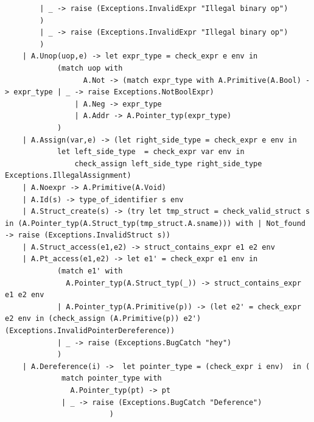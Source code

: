 \documentclass{article}
\begin{document}
\begin{lstlisting}
		| _ -> raise (Exceptions.InvalidExpr "Illegal binary op") 
		)
		| _ -> raise (Exceptions.InvalidExpr "Illegal binary op") 
		) 
	| A.Unop(uop,e) -> let expr_type = check_expr e env in
			(match uop with
				  A.Not -> (match expr_type with A.Primitive(A.Bool) -> expr_type | _ -> raise Exceptions.NotBoolExpr) 
				| A.Neg -> expr_type
				| A.Addr -> A.Pointer_typ(expr_type)
			)
	| A.Assign(var,e) -> (let right_side_type = check_expr e env in 
			let left_side_type  = check_expr var env in
				check_assign left_side_type right_side_type Exceptions.IllegalAssignment)
	| A.Noexpr -> A.Primitive(A.Void)
	| A.Id(s) -> type_of_identifier s env 
	| A.Struct_create(s) -> (try let tmp_struct = check_valid_struct s in (A.Pointer_typ(A.Struct_typ(tmp_struct.A.sname))) with | Not_found -> raise (Exceptions.InvalidStruct s))
	| A.Struct_access(e1,e2) -> struct_contains_expr e1 e2 env
	| A.Pt_access(e1,e2) -> let e1' = check_expr e1 env in
			(match e1' with
			  A.Pointer_typ(A.Struct_typ(_)) -> struct_contains_expr e1 e2 env
			| A.Pointer_typ(A.Primitive(p)) -> (let e2' = check_expr e2 env in (check_assign (A.Primitive(p)) e2') (Exceptions.InvalidPointerDereference))
			| _ -> raise (Exceptions.BugCatch "hey")
			)
	| A.Dereference(i) ->  let pointer_type = (check_expr i env)  in (
			 match pointer_type with 
			   A.Pointer_typ(pt) -> pt
			 | _ -> raise (Exceptions.BugCatch "Deference") 
						)
				

\end{lstlisting}
\end{document}
